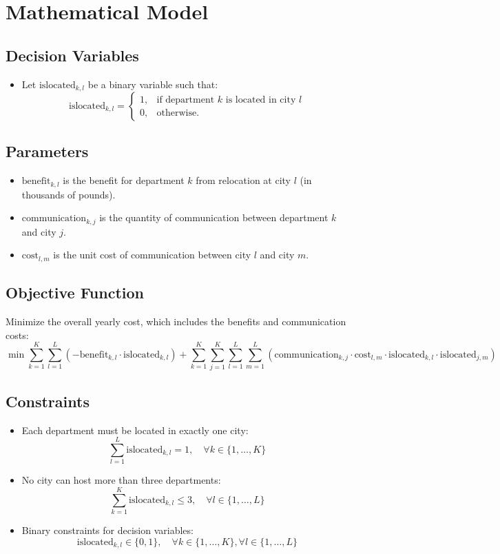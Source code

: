 \documentclass{article}
\begin{document}
\section*{Mathematical Model}

\subsection*{Decision Variables}
\begin{itemize}
    \item Let \( \text{islocated}_{k, l} \) be a binary variable such that:
    \[
    \text{islocated}_{k, l} = 
    \begin{cases} 
    1, & \text{if department } k \text{ is located in city } l \\
    0, & \text{otherwise.}
    \end{cases}
    \]
\end{itemize}

\subsection*{Parameters}
\begin{itemize}
    \item \( \text{benefit}_{k, l} \) is the benefit for department \( k \) from relocation at city \( l \) (in thousands of pounds).
    \item \( \text{communication}_{k, j} \) is the quantity of communication between department \( k \) and city \( j \).
    \item \( \text{cost}_{l, m} \) is the unit cost of communication between city \( l \) and city \( m \).
\end{itemize}

\subsection*{Objective Function}
Minimize the overall yearly cost, which includes the benefits and communication costs:
\[
\min \sum_{k=1}^{K} \sum_{l=1}^{L} \left( -\text{benefit}_{k, l} \cdot \text{islocated}_{k, l} \right) + \sum_{k=1}^{K} \sum_{j=1}^{K} \sum_{l=1}^{L} \sum_{m=1}^{L} \left( \text{communication}_{k, j} \cdot \text{cost}_{l, m} \cdot \text{islocated}_{k, l} \cdot \text{islocated}_{j, m} \right)
\]

\subsection*{Constraints}
\begin{itemize}
    \item Each department must be located in exactly one city:
    \[
    \sum_{l=1}^{L} \text{islocated}_{k, l} = 1, \quad \forall k \in \{1, \ldots, K\}
    \]
    \item No city can host more than three departments:
    \[
    \sum_{k=1}^{K} \text{islocated}_{k, l} \leq 3, \quad \forall l \in \{1, \ldots, L\}
    \]
    \item Binary constraints for decision variables:
    \[
    \text{islocated}_{k, l} \in \{0, 1\}, \quad \forall k \in \{1, \ldots, K\}, \forall l \in \{1, \ldots, L\}
    \]
\end{itemize}
\end{document}
